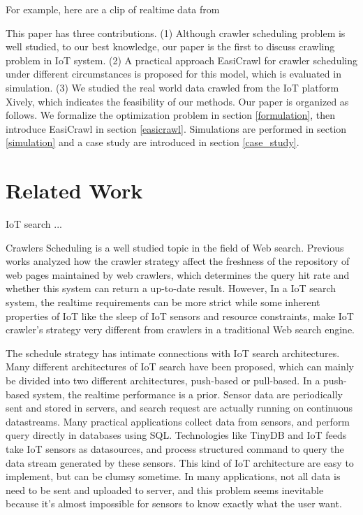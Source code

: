 \documentclass[conference]{IEEEtran}
\begin{document}
For example, here are a clip of realtime data from 


This paper has three contributions.
(1) Although crawler scheduling problem is well studied, to our best knowledge, our paper is the first to discuss crawling problem in IoT system.
(2) A practical approach EasiCrawl for crawler scheduling under different circumstances is proposed for this model, which is evaluated in simulation.
(3) We studied the real world data crawled from the IoT platform Xively\cite{xively}, which indicates the feasibility of our methods.
Our paper is organized as follows. 
We formalize the optimization problem in section \ref{formulation}, then introduce EasiCrawl in section \ref{easicrawl}. Simulations are performed in section \ref{simulation} and a case study are introduced in section \ref{case_study}. 

\section{Related Work}\label{related_work}

IoT search ...

Crawlers Scheduling is a well studied topic in the field of Web search. Previous works\cite{Cho2000}\cite{Wolf2002}\cite{Challenger2004} analyzed how the crawler strategy affect the freshness of the repository of web pages maintained by web crawlers, which determines the query hit rate and whether this system can return a up-to-date result. However, In a IoT search system, the realtime requirements can be more strict while some inherent properties of IoT like the sleep of IoT sensors and resource constraints, make IoT crawler's strategy very different from crawlers in a traditional Web search engine. 


The schedule strategy has intimate connections with IoT search architectures.
Many different architectures of IoT search have been proposed, which can mainly be divided into two different architectures, push-based or pull-based.
In a push-based system, the realtime performance is a prior. Sensor data are periodically sent and stored in servers, and search request are actually running on continuous datastreams. Many practical applications collect data from sensors, and perform query directly in databases using SQL. Technologies like TinyDB\cite{TinyDB} and IoT feeds\cite{Whitehouse2006} take IoT sensors as datasources, and process structured command to query the data stream generated by these sensors. This kind of IoT architecture are easy to implement, but can be clumsy sometime. In many applications, not all data is need to be sent and uploaded to server, and this problem seems inevitable because it's almost impossible for sensors to know exactly what the user want.
\end{document}
